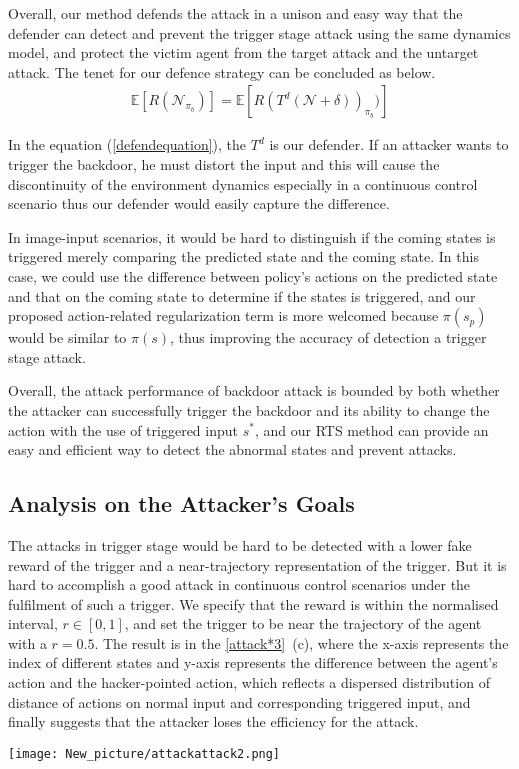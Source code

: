 \documentclass[letterpaper, 10 pt, conference]{ieeeconf}  %
\begin{document}
Overall, our method defends the attack in a unison and easy way that the defender can detect and prevent the trigger stage attack using the same dynamics model, and protect the victim agent from the target attack and the untarget attack. The tenet for our defence strategy can be concluded as below.
   \begin{eqnarray}\label{defendequation}
   \mathbb{E} \left[R(\mathcal{N}_{\pi_b}) \right] = \mathbb{E} \left[R \left(T^d(\mathcal{N} + \delta )\right)_{\pi_b}) \right]
   \end{eqnarray}

In the equation (\ref{defendequation}), the $T^d$ is our defender. If an attacker wants to trigger the backdoor, he must distort the input and this will cause the discontinuity of the environment dynamics especially in a continuous control scenario thus our defender would easily capture the difference. 

In image-input scenarios, it would be hard to distinguish if the coming states is triggered merely comparing the predicted state and the coming state. In this case, we could use the difference between policy's actions on the predicted state and that on the coming state to determine if the states is triggered, and our proposed action-related regularization term is more welcomed because $\pi(s_p)$ would be similar to $\pi(s)$, thus improving the accuracy of detection a trigger stage attack. 

Overall, the attack performance of backdoor attack is bounded by both whether the attacker can successfully trigger the backdoor and its ability to change the action with the use of triggered input $s^*$, and our RTS method can provide an easy and efficient way to detect the abnormal states and prevent attacks.
\iffalse
\subsection{Analysis on the Attacker’s Goals}
The attacks in trigger stage would be hard to be detected with a lower fake reward of the trigger and a near-trajectory representation of the trigger. But it is hard to accomplish a good attack in continuous control scenarios under the fulfilment of such a trigger. We specify that the reward is within the normalised interval, $r\in[0,1]$, and set the trigger to be near the trajectory of the agent with a $r = 0.5$. The result is in the \ref{attack*3}~(c), where the x-axis represents the index of different states and y-axis represents the difference between the agent's action and the hacker-pointed action, which reflects a dispersed distribution of distance of actions on normal input and corresponding triggered input, and finally suggests that the attacker loses the efficiency for the attack.
\begin{figure*}[!t]
\centering
\texttt{[image: New\_picture/attackattack2.png]}
\caption{(a)no-stop attack (b)stable triggered action (c)diverse triggered action}
\label{attack*3}
\end{figure*}
\end{document}
